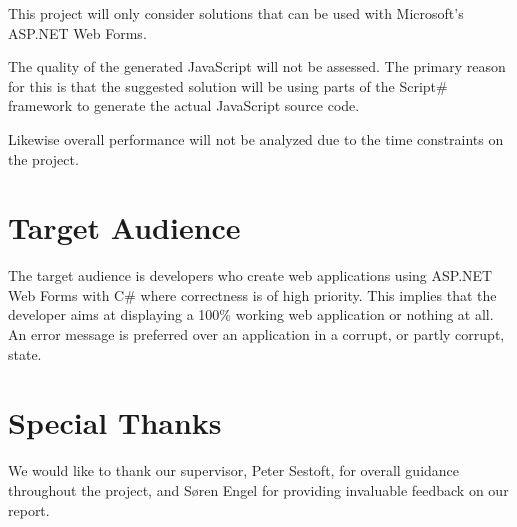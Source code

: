 		This project will only consider solutions that can be used with Microsoft's ASP.NET Web Forms.

		The quality of the generated JavaScript will not be assessed. The primary reason for this is that the suggested solution will be using parts of the Script\# framework to generate the actual JavaScript source code.

		Likewise overall performance will not be analyzed due to the time constraints on the project.


\section{Target Audience} %
\label{sec:section_name}
	The target audience is developers who create web applications using ASP.NET Web Forms with C\# where correctness is of high priority. This implies that the developer aims at displaying a 100\% working web application or nothing at all. An error message is preferred over an application in a corrupt, or partly corrupt, state.

\section{Special Thanks} %
\label{sec:special_thanks}
We would like to thank our supervisor, Peter Sestoft, for overall guidance throughout the project, and S\o ren Engel for providing invaluable feedback on our report.






